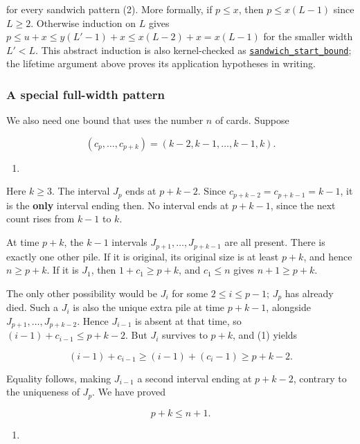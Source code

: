 \documentclass[11pt,a4paper]{article}
\providecommand{\tightlist}{\setlength{\itemsep}{0pt}\setlength{\parskip}{0pt}}
\begin{document}
for every sandwich pattern (2). More formally, if \(p\le x\), then \(p\le x(L-1)\) since \(L\ge2\). Otherwise induction on \(L\) gives \(p\le u+x\le y(L'-1)+x\le x(L-2)+x=x(L-1)\) for the smaller width \(L'<L\). This abstract induction is also kernel-checked as \href{https://github.com/mpelteshki/climbing-to-the-frontier/blob/212bba53b1818c08c40b8c4b48f636651eaf6410/cagent/p3/lean/ProofPursuit/P3/C2SandwichBound.lean}{\texttt{sandwich\_start\_bound}}; the lifetime argument above proves its application hypotheses in writing.

\subsubsection{A special full-width pattern}\label{a-special-full-width-pattern}

We also need one bound that uses the number \(n\) of cards. Suppose

\[
(c_p,\ldots,c_{p+k})=(k-2,k-1,\ldots,k-1,k).
\]

\begin{enumerate}
\def\labelenumi{(\arabic{enumi})}
\setcounter{enumi}{6}
\tightlist
\item
\end{enumerate}

Here \(k\ge3\). The interval \(J_p\) ends at \(p+k-2\). Since \(c_{p+k-2}=c_{p+k-1}=k-1\), it is the \textbf{only} interval ending then. No interval ends at \(p+k-1\), since the next count rises from \(k-1\) to \(k\).

At time \(p+k\), the \(k-1\) intervals \(J_{p+1},\ldots,J_{p+k-1}\) are all present. There is exactly one other pile. If it is original, its original size is at least \(p+k\), and hence \(n\ge p+k\). If it is \(J_1\), then \(1+c_1\ge p+k\), and \(c_1\le n\) gives \(n+1\ge p+k\).

The only other possibility would be \(J_i\) for some \(2\le i\le p-1\); \(J_p\) has already died. Such a \(J_i\) is also the unique extra pile at time \(p+k-1\), alongside \(J_{p+1},\ldots,J_{p+k-2}\). Hence \(J_{i-1}\) is absent at that time, so \((i-1)+c_{i-1}\le p+k-2\). But \(J_i\) survives to \(p+k\), and (1) yields

\[
(i-1)+c_{i-1}\ge(i-1)+(c_i-1)\ge p+k-2.
\]

Equality follows, making \(J_{i-1}\) a second interval ending at \(p+k-2\), contrary to the uniqueness of \(J_p\). We have proved

\[
\boxed{p+k\le n+1}.
\]

\begin{enumerate}
\def\labelenumi{(\arabic{enumi})}
\setcounter{enumi}{7}
\tightlist
\item
\end{enumerate}
\end{document}
